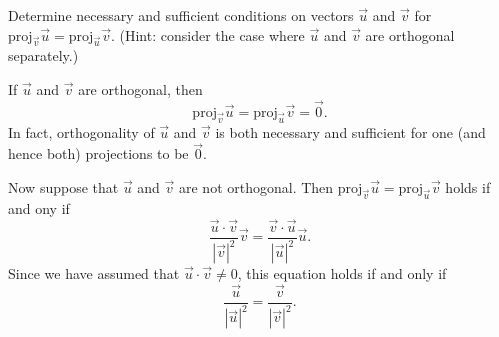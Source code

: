 \documentclass[]{ximera}
\begin{document}
\begin{problem}
Determine necessary and sufficient conditions on vectors $\vec{u}$ and $\vec{v}$ for $\mathrm{proj}_\vec{v} \vec{u} = \mathrm{proj}_\vec{u} \vec{v}$. (Hint: consider the case where $\vec{u}$ and $\vec{v}$ are orthogonal separately.)

\begin{solution}
If $\vec{u}$ and $\vec{v}$ are orthogonal, then
$$
\mathrm{proj}_\vec{v} \vec{u} = \mathrm{proj}_\vec{u} \vec{v} = \vec{0}.
$$
In fact, orthogonality of $\vec{u}$ and $\vec{v}$ is both necessary and sufficient for one (and hence both) projections to be $\vec{0}$. 

Now suppose that $\vec{u}$ and $\vec{v}$ are not orthogonal. Then $\mathrm{proj}_\vec{v} \vec{u} = \mathrm{proj}_\vec{u} \vec{v}$ holds if and ony if 
$$
\frac{\vec{u} \cdot \vec{v}}{\left|\vec{v}\right|^2} \vec{v} = \frac{\vec{v} \cdot \vec{u}}{\left|\vec{u}\right|^2} \vec{u}.
$$
Since we have assumed that $\vec{u} \cdot \vec{v} \neq 0$, this equation holds if and only if
$$
\frac{\vec{u}}{\left|\vec{u}\right|^2} = \frac{\vec{v}}{\left|\vec{v}\right|^2}.
$$
\end{solution}
\end{problem}
\end{document}
